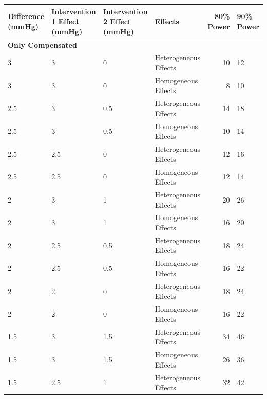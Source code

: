 \documentclass[
]{article}
\begin{document}
\begin{table}[H]
\centering
\begin{tabular}{l|l|l|l|r|l}
\hline
Difference (mmHg) & Intervention 1 Effect (mmHg) & Intervention 2 Effect (mmHg) & Effects & 80\% Power & 90\% Power\\
\hline
\multicolumn{6}{l}{\textbf{Only Compensated}}\\
\hline
\hspace{1em}3 & 3 & 0 & Heterogeneous Effects & 10 & 12\\
\hline
\hspace{1em}3 & 3 & 0 & Homogeneous Effects & 8 & 10\\
\hline
\hspace{1em}2.5 & 3 & 0.5 & Heterogeneous Effects & 14 & 18\\
\hline
\hspace{1em}2.5 & 3 & 0.5 & Homogeneous Effects & 10 & 14\\
\hline
\hspace{1em}2.5 & 2.5 & 0 & Heterogeneous Effects & 12 & 16\\
\hline
\hspace{1em}2.5 & 2.5 & 0 & Homogeneous Effects & 12 & 14\\
\hline
\hspace{1em}2 & 3 & 1 & Heterogeneous Effects & 20 & 26\\
\hline
\hspace{1em}2 & 3 & 1 & Homogeneous Effects & 16 & 20\\
\hline
\hspace{1em}2 & 2.5 & 0.5 & Heterogeneous Effects & 18 & 24\\
\hline
\hspace{1em}2 & 2.5 & 0.5 & Homogeneous Effects & 16 & 22\\
\hline
\hspace{1em}2 & 2 & 0 & Heterogeneous Effects & 18 & 24\\
\hline
\hspace{1em}2 & 2 & 0 & Homogeneous Effects & 16 & 22\\
\hline
\hspace{1em}1.5 & 3 & 1.5 & Heterogeneous Effects & 34 & 46\\
\hline
\hspace{1em}1.5 & 3 & 1.5 & Homogeneous Effects & 26 & 36\\
\hline
\hspace{1em}1.5 & 2.5 & 1 & Heterogeneous Effects & 32 & 42\\
\hline

\end{tabular}
\end{table}
\end{document}
